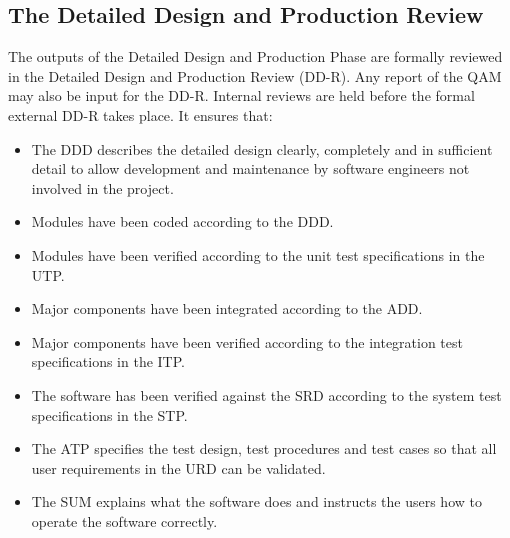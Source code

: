\subsection{The Detailed Design and Production Review}
The outputs of the Detailed Design and Production Phase are formally reviewed in the Detailed Design and Production Review (DD-R). Any report of the QAM may also be input for the DD-R. Internal reviews are held before the formal external DD-R takes place. It ensures that:
\begin{itemize}
	\item The DDD describes the detailed design clearly, completely and in sufficient detail to allow development and maintenance by software engineers not involved in the project.
	\item  Modules have been coded according to the DDD.
	\item Modules have been verified according to the unit test specifications in the UTP.
	\item Major components have been integrated according to the ADD.
	\item Major components have been verified according to the integration test specifications in the ITP.
	\item The software has been verified against the SRD according to the system test specifications in the STP.
	\item The ATP specifies the test design, test procedures and test cases so that all user requirements in the URD can be validated.
	\item The SUM explains what the software does and instructs the users how to operate the software correctly.
\end{itemize}